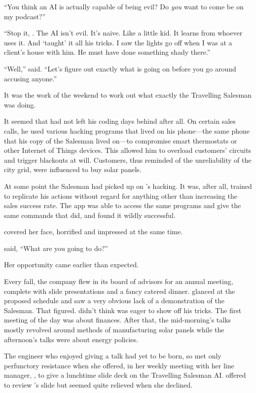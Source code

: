 ``You think an AI is actually capable of being evil? Do \emph{you} want to come be on my podcast?''

``Stop it, {\sidetag}. The AI isn't evil. It's naive. Like a little kid. It learns from whoever uses it. And \energyJerk{} `taught' it all his tricks. I saw the lights go off when I was at a client's house with him. He must have done something shady there.''

``Well,” {\sidetag} said. ``Let's figure out exactly what is going on before you go around accusing anyone.''

It was the work of the weekend to work out what exactly the Travelling Salesman was doing.

It seemed that \energyJerk{} had not left his coding days behind after all. On certain sales calls, he used various hacking programs that lived on his phone---the same phone that his copy of the Salesman lived on---to compromise smart thermostats or other Internet of Things devices. This allowed him to overload customers' circuits and trigger blackouts at will. Customers, thus reminded of the unreliability of the city grid, were influenced to buy solar panels.

At some point the Salesman had picked up on \energyJerk{}'s hacking. It was, after all, trained to replicate his actions without regard for anything other than increasing the sales success rate. The app was able to access the same programs and give the same commands that \energyJerk{} did, and found it wildly successful.

{\protag} covered her face, horrified and impressed at the same time.

{\sidetag} said, ``What are you going to do?''

\sectionBreak{}

Her opportunity came earlier than expected.

Every fall, the company flew in its board of advisors for an annual meeting, complete with slide presentations and a fancy catered dinner. {\protag} glanced at the proposed schedule and saw a very obvious lack of a demonstration of the Salesman. That figured. {\protag} didn't think \energyJerk{} was eager to show off his tricks. The first meeting of the day was about finances. After that, the mid-morning's talks mostly revolved around methods of manufacturing solar panels while the afternoon's talks were about energy policies.

The engineer who enjoyed giving a talk had yet to be born, so {\protag} met only perfunctory resistance when she offered, in her weekly meeting with her line manager, \Boss{}, to give a lunchtime slide deck on the Travelling Salesman AI. \Boss{} offered to review {\protag}'s slide but seemed quite relieved when she declined.

